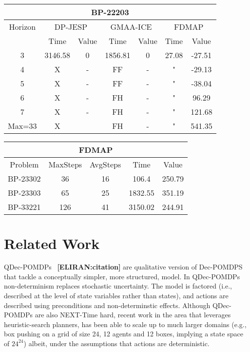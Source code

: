 \documentclass[letterpaper]{article} %
\newcommand{\eliran}[1]{\textbf{[\color{red}ELIRAN:#1]}}
\begin{document}
\begin{center}
    \begin{tabular}{||c|c|c|c|c|c|c||}
         \hline
         \multicolumn{7}{||c||}{BP-22203} \\
         \hline
         Horizon & \multicolumn{2}{|c|}{DP-JESP} & \multicolumn{2}{|c|}{GMAA-ICE} & \multicolumn{2}{|c||}{FDMAP}\\ 
         \hline
         & Time & Value & Time & Value & Time & Value \\
         \hline
         3 & 3146.58 & 0 & 1856.81 & 0 & 27.08 & -27.51 \\
         \hline
         4 & X & - & FF & - & " & -29.13 \\
         \hline
         5 & X & - & FF & - & " & -38.04 \\ 
         \hline
         6 & X & - & FH & - & " & 96.29 \\
         \hline
         7 & X & - & FH & - & " & 121.68 \\
         \hline
         Max=33 & X &  & FH & - & " & 541.35 \\
         \hline
    \end{tabular}
\end{center}

\begin{center}
    \begin{tabular}{||c|c|c|c|c||}
         \hline
         \multicolumn{5}{||c||}{FDMAP}\\ 
         \hline
         Problem & MaxSteps & AvgSteps & Time & Value \\
         \hline
         BP-23302 & 36 & 16 & 106.4 & 250.79 \\
         \hline
         BP-23303 & 65 & 25 & 1832.55 & 351.19 \\
         \hline
         BP-33221 & 126 & 41 & 3150.02 & 244.91 \\
         \hline
    \end{tabular}
\end{center}
\section{Related Work}
QDec-POMDPs~\cite{} \eliran{citation} are qualitative version of Dec-POMDPS that tackle a conceptually simpler, more structured, model. In QDec-POMDPs 
non-determinism replaces stochastic uncertainty. The model is factored (i.e., described at the level of state variables rather than states), and actions 
are described using preconditions and non-determinstic effects. Although QDec-POMDPs are also NEXT-Time hard, recent work in the area that leverages heuristic-search planners, has been able to scale up to much larger domains (e.g., box pushing on a grid of size 24,  12 agents and 12 boxes, implying a state space of $24^{24}$)
albeit, under the assumptions that actions are deterministic.
\end{document}
